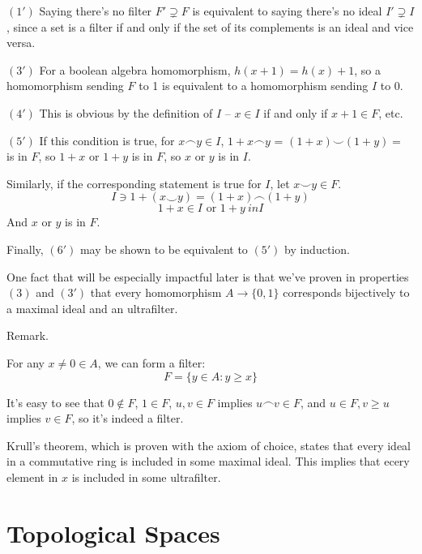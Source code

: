 \documentclass{article}
\begin{document}
      $(1')$ Saying there's no filter $F' \supsetneq F$ is equivalent to saying
      there's no ideal $I' \supsetneq I$, since a set is a filter if and only if
      the set of its complements is an ideal and vice versa.

      $(3')$ For a boolean algebra homomorphism, $h(x+1) = h(x) + 1$, so a
      homomorphism sending $F$ to 1 is equivalent to a homomorphism sending $I$
      to 0.

      $(4')$ This is obvious by the definition of $I$ -- $x \in I$ if and only
      if $x+1 \in F$, etc.

      $(5')$ If this condition is true, for $x \frown y \in I$, $1+ x \frown y$
      = $(1+x) \smile (1+y) = $ is in $F$, so $1+x$ or $1+y$ is in $F$, so $x$
      or $y$ is in $I$.

      Similarly, if the corresponding statement is true for $I$, let $x \smile y
      \in F$.
      \[I \ni 1 + (x \smile y) = (1 + x) \frown (1 + y)\]
      \[1 + x \in I \text{ or } 1 + y \ in I\]
      And $x$ or $y$ is in $F$.

      Finally, $(6')$ may be shown to be equivalent to $(5')$ by induction.

      One fact that will be especially impactful later is that we've proven in
      properties $(3)$ and $(3')$ that every homomorphism $A \rightarrow
      \{0,1\}$ corresponds bijectively to a maximal ideal and an ultrafilter.

      Remark.

      For any $x \neq 0 \in A$, we can form a filter:
      \[ F = \{y \in A: y \geq x\}\]

      It's easy to see that $0 \notin F$, $1 \in F$, $u, v \in F$ implies $u
      \frown v \in F$, and $u \in F, v \geq u$ implies $v \in F$, so it's indeed
      a filter.

      Krull's theorem, which is proven with the axiom of choice, states that
      every ideal in a commutative ring is included in some maximal ideal. This
      implies that ecery element in $x$ is included in some ultrafilter.
%





    \section{Topological Spaces}
\end{document}
